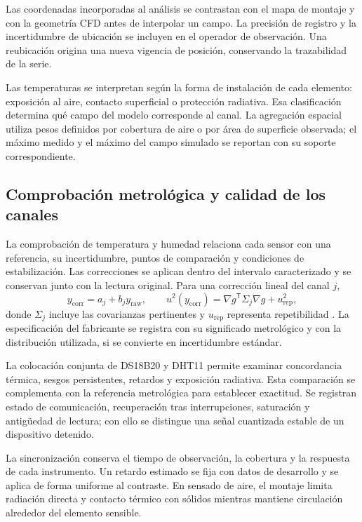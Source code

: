 Las coordenadas incorporadas al análisis se contrastan con el mapa de montaje y con la geometría CFD antes de interpolar un campo. La precisión de registro y la incertidumbre de ubicación se incluyen en el operador de observación. Una reubicación origina una nueva vigencia de posición, conservando la trazabilidad de la serie.

Las temperaturas se interpretan según la forma de instalación de cada elemento: exposición al aire, contacto superficial o protección radiativa. Esa clasificación determina qué campo del modelo corresponde al canal. La agregación espacial utiliza pesos definidos por cobertura de aire o por área de superficie observada; el máximo medido y el máximo del campo simulado se reportan con su soporte correspondiente.

\subsection{Comprobación metrológica y calidad de los canales}

La comprobación de temperatura y humedad relaciona cada sensor con una referencia, su incertidumbre, puntos de comparación y condiciones de estabilización. Las correcciones se aplican dentro del intervalo caracterizado y se conservan junto con la lectura original. Para una corrección lineal del canal $j$,
\begin{equation}
y_{\mathrm{corr}}=a_j+b_jy_{\mathrm{raw}},\qquad
u^2(y_{\mathrm{corr}})=\nabla g^{\mathsf T}\Sigma_j\nabla g+u_{\mathrm{rep}}^2,
\label{met:correccion_sensor}
\end{equation}
donde $\Sigma_j$ incluye las covarianzas pertinentes y $u_{\mathrm{rep}}$ representa repetibilidad \cite{jcgm2008}. La especificación del fabricante se registra con su significado metrológico y con la distribución utilizada, si se convierte en incertidumbre estándar.

La colocación conjunta de DS18B20 y DHT11 permite examinar concordancia térmica, sesgos persistentes, retardos y exposición radiativa. Esta comparación se complementa con la referencia metrológica para establecer exactitud. Se registran estado de comunicación, recuperación tras interrupciones, saturación y antigüedad de lectura; con ello se distingue una señal cuantizada estable de un dispositivo detenido.

La sincronización conserva el tiempo de observación, la cobertura y la respuesta de cada instrumento. Un retardo estimado se fija con datos de desarrollo y se aplica de forma uniforme al contraste. En sensado de aire, el montaje limita radiación directa y contacto térmico con sólidos mientras mantiene circulación alrededor del elemento sensible.

